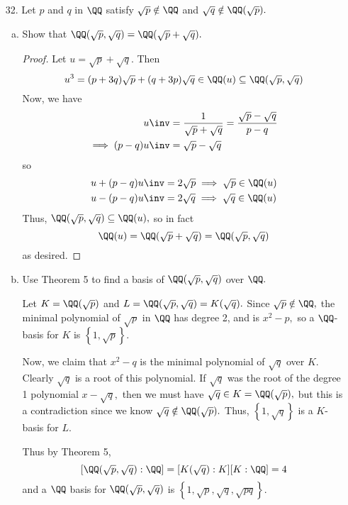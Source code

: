 \documentclass{article}
\begin{document}
\begin{itemize}
		\newpage
	\item[32.] Let $p$ and $q$ in $\QQ$ satisfy $\sqrt{p}\notin \QQ$ and $\sqrt{q}\notin \QQ(\sqrt{p}).$
		\begin{enumerate}[(a)]
			\item Show that $\QQ(\sqrt{p}, \sqrt{q})=\QQ(\sqrt{p}+\sqrt{q}).$
				\begin{proof}
					Let $u=\sqrt{p}+\sqrt{q}.$ Then
					\[u^3=(p+3q)\sqrt{p}+(q+3p)\sqrt{q}\in\QQ(u)\subseteq \QQ(\sqrt{p}, \sqrt{q})\]
					Now, we have
					\begin{align*}
						u\inv &= \frac{1}{\sqrt{p}+\sqrt{q}} = \frac{\sqrt{p}-\sqrt{q}}{p-q} \\
						\implies (p-q)u\inv &= \sqrt{p}-\sqrt{q} \\	
					\end{align*}
					so
					\begin{align*}
						u+(p-q)u\inv &= 2\sqrt{p} \implies \sqrt{p}\in \QQ(u) \\
						u-(p-q)u\inv &= 2\sqrt{q} \implies \sqrt{q}\in \QQ(u)
					\end{align*}
					Thus, $\QQ(\sqrt{p}, \sqrt{q})\subseteq \QQ(u),$ so in fact
					\[\QQ(u)=\QQ(\sqrt{p}+\sqrt{q}) = \QQ(\sqrt{p}, \sqrt{q})\]
					as desired.
				\end{proof}

			\item Use Theorem 5 to find a basis of $\QQ(\sqrt{p}, \sqrt{q})$ over $\QQ.$
				\begin{soln}
					Let $K=\QQ(\sqrt{p})$ and $L=\QQ(\sqrt{p}, \sqrt{q}) = K(\sqrt{q}).$ Since $\sqrt{p}\notin\QQ,$ the minimal polynomial of $\sqrt{p}$ in $\QQ$ has degree 2, and is $x^2-p,$ so a $\QQ$-basis for $K$ is $\left\{ 1, \sqrt{p} \right\}.$ 

					Now, we claim that $x^2-q$ is the minimal polynomial of $\sqrt{q}$ over $K.$ Clearly $\sqrt{q}$ is a root of this polynomial. If $\sqrt{q}$ was the root of the degree 1 polynomial $x-\sqrt{q},$ then we must have $\sqrt{q}\in K=\QQ(\sqrt{p}),$ but this is a contradiction since we know $\sqrt{q}\notin\QQ(\sqrt{p}).$ Thus, $\left\{ 1, \sqrt{q} \right\}$ is a $K$-basis for $L.$ 

					Thus by Theorem 5,
					\[[\QQ(\sqrt{p}, \sqrt{q}):\QQ] = [K(\sqrt{q}):K][K:\QQ]=4\]
					and a $\QQ$ basis for $\QQ(\sqrt{p}, \sqrt{q})$ is $\left\{ 1, \sqrt{p}, \sqrt{q}, \sqrt{pq} \right\}.$
				\end{soln}


\end{enumerate}
\end{itemize}
\end{document}
